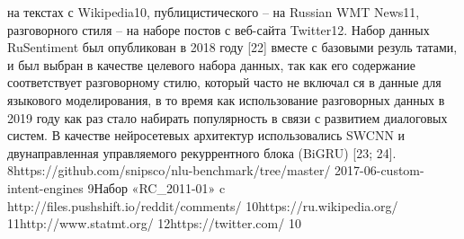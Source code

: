 на текстах с Wikipedia10, публицистического – на Russian WMT News11,
разговорного стиля – на наборе постов с веб-сайта Twitter12. Набор данных
RuSentiment был опубликован в 2018 году [22] вместе с базовыми резуль
татами, и был выбран в качестве целевого набора данных, так как его
содержание соответствует разговорному стилю, который часто не включал
ся в данные для языкового моделирования, в то время как использование
разговорных данных в 2019 году как раз стало набирать популярность в
связи с развитием диалоговых систем. В качестве нейросетевых архитектур
использовались SWCNN и двунаправленная управляемого рекуррентного
блока (BiGRU) [23; 24].
8https://github.com/snipsco/nlu-benchmark/tree/master/
2017-06-custom-intent-engines
9Набор «RC_2011-01» c http://files.pushshift.io/reddit/comments/
10https://ru.wikipedia.org/
11http://www.statmt.org/
12https://twitter.com/
10
\fi